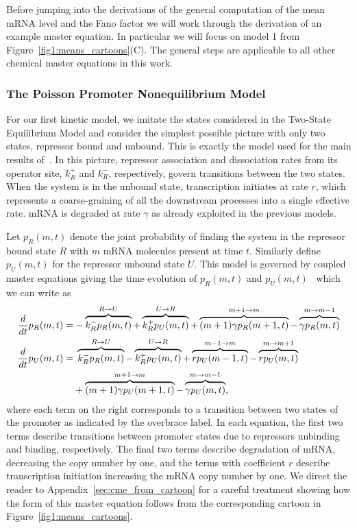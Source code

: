 
Before jumping into the derivations of the general
computation of the mean mRNA level and the Fano factor we will work through the
derivation of an example master equation. In particular we will focus on model 1
from Figure~\ref{fig1:means_cartoons}(C). The general steps are applicable to
all other chemical master equations in this work.

\subsubsection{The Poisson Promoter Nonequilibrium Model}
For our first kinetic model, we  imitate the states considered in the Two-State
Equilibrium Model and consider the simplest possible picture with only two
states, repressor bound and unbound. This is exactly the model used for the main
results of~\cite{Jones2014}. In this picture, repressor association and
dissociation rates from its operator site, $k_R^+$ and $k_R^-$, respectively,
govern transitions between the two states. When the system is in the unbound
state, transcription initiates at rate $r$, which represents a coarse-graining
of all the downstream processes into a single effective rate. mRNA is degraded
at rate $\gamma$ as already exploited in the previous models.

Let $p_R(m,t)$ denote the joint probability of finding the system in the
repressor bound state $R$ with $m$ mRNA molecules present at time $t$. Similarly
define $p_U(m,t)$ for the repressor unbound state $U$. This model is governed
by coupled master equations giving the time evolution of $p_R(m,t)$ and
$p_U(m,t)$~\cite{Sanchez2008, Sanchez2011, Phillips2019} which we can write as
\begin{align}
\begin{split}
\frac{d {}}{d t}p_R(m,t) =& 
- \overbrace{k_R^- p_R(m,t)}^{R \rightarrow U}
+ \overbrace{k_R^+ p_U(m,t)}^{U \rightarrow R}
+ \overbrace{(m+1)\gamma p_R(m+1,t)}^{m + 1 \rightarrow m}
- \overbrace{\gamma p_R(m,t)}^{m \rightarrow m - 1}
\\
\frac{d {}}{d t}p_U(m,t) =&\; 
\overbrace{k_R^- p_R(m,t)}^{R \rightarrow U}
- \overbrace{k_R^+ p_U(m,t)}^{U \rightarrow R}
+ \overbrace{rp_U(m-1,t)}^{m-1 \rightarrow m}
- \overbrace{rp_U(m,t)}^{m \rightarrow m + 1}
\\
&+ \overbrace{(m+1)\gamma p_U(m+1,t)}^{m + 1 \rightarrow m}
- \overbrace{\gamma p_U(m,t)}^{m \rightarrow m - 1},
\label{eq:poisson_promoter_cme}
\end{split}
\end{align}
where each term on the right corresponds to a transition between two states of
the promoter as indicated by the overbrace label. In each equation, the first
two terms describe transitions between promoter states due to repressors
unbinding and binding, respectively. The final two terms describe degradation of
mRNA, decreasing the copy number by one, and the terms with coefficient $r$
describe transcription initiation increasing the mRNA copy number by one.
We direct the reader to Appendix~\ref{sec:cme_from_cartoon} for a careful
treatment showing how the form of this master equation follows from the
corresponding cartoon in Figure~\ref{fig1:means_cartoons}.

